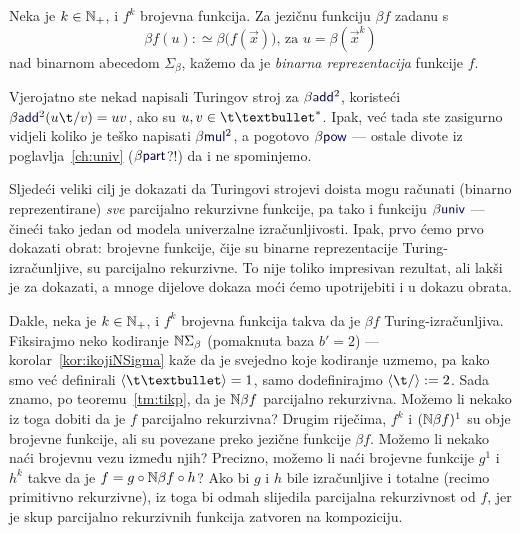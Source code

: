 \begin{definicija}[{name=[binarna reprezentacija brojevne funkcije]}]
Neka je $k\in{\mathbb N}_+$, i $f^k$ brojevna funkcija. Za jezičnu funkciju $\beta f$ zadanu s \begin{equation}\label{eq:betaf}
    \beta f(u):\simeq\beta\bigl(f(\vec x)\bigr)\text{, za } u=\beta(\vec x^k)
\end{equation}
nad binarnom abecedom $\Sigma_\beta$, kažemo da je \emph{binarna reprezentacija} funkcije $f$.
\end{definicija}

Vjerojatno ste nekad napisali Turingov stroj za $\beta\f{add}^2$, koristeći $\beta\f{add}^2(u\t/v)=uv$, ako su $u,v\in\t\textbullet^*$. Ipak, već tada ste zasigurno vidjeli koliko je teško napisati $\beta\f{mul}^2$, a pogotovo $\beta\f{pow}$ --- ostale divote iz poglavlja~\ref{ch:univ} ($\beta\f{part}$?!) da i ne spominjemo.

Sljedeći veliki cilj je dokazati da Turingovi strojevi doista mogu računati (binarno reprezentirane) \emph{sve} parcijalno rekurzivne funkcije, pa tako i funkciju $\beta\f{univ}$ --- čineći tako jedan od modela univerzalne izračunljivosti. Ipak, prvo ćemo prvo dokazati obrat: brojevne funkcije, čije su binarne reprezentacije Turing-izračunljive, su parcijalno rekurzivne. To nije toliko impresivan rezultat, ali lakši je za dokazati, a mnoge dijelove dokaza moći ćemo upotrijebiti i u dokazu obrata.


Dakle, neka je $k\in{\mathbb N}_+$, i $f^k$ brojevna funkcija takva da je $\beta f$ Turing-izračunljiva. Fiksirajmo neko kodiranje ${\mathbb N}\Sigma_\beta$ (pomaknuta baza $b'=2$) --- korolar~\ref{kor:ikojiNSigma} kaže da je svejedno koje kodiranje uzmemo, pa kako smo već definirali $\kr{\t\textbullet}=1$, samo dodefinirajmo $\kr{\t/}:=2$.
Sada znamo, po teoremu~\ref{tm:tikp}, da je ${\mathbb N}\beta f$ parcijalno rekurzivna. Možemo li nekako iz toga dobiti da je $f$ parcijalno rekurzivna? Drugim riječima, $f^k$ i $({\mathbb N}\beta f)^1$ su obje brojevne funkcije, ali su povezane preko jezične funkcije $\beta f$. Možemo li nekako naći brojevnu vezu između njih? Precizno, možemo li naći brojevne funkcije $g^1$ i $h^k$ takve da je $f=g\circ{\mathbb N}\beta f\circ h$? Ako bi $g$ i $h$ bile izračunljive i totalne (recimo primitivno rekurzivne), iz toga bi odmah slijedila parcijalna rekurzivnost od $f$, jer je skup parcijalno rekurzivnih funkcija zatvoren na kompoziciju.

